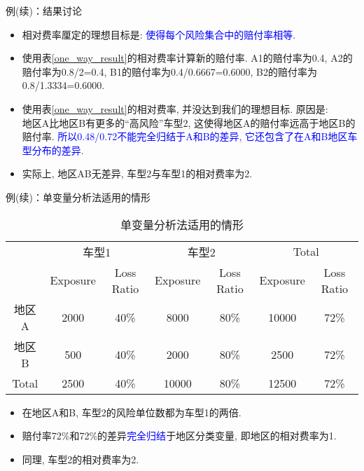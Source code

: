 \documentclass[professionalfont]{beamer}
\newcommand{\blue}[1]{\textcolor{blue}{#1}}
\begin{document}
\begin{frame}{例(续)：结果讨论}
\begin{itemize}	
\item 相对费率厘定的理想目标是: \blue{使得每个风险集合中的赔付率相等}.
\item 使用表\ref{one_way_result}的相对费率计算新的赔付率. A1的赔付率为0.4, A2的赔付率为0.8/2=0.4, B1的赔付率为0.4/0.6667=0.6000, B2的赔付率为0.8/1.3334=0.6000.
\item 使用表\ref{one_way_result}的相对费率, 并没达到我们的理想目标. 原因是:\\
地区A比地区B有更多的``高风险''车型2, 这使得地区A的赔付率远高于地区B的赔付率. \blue{所以0.48/0.72不能完全归结于A和B的差异, 它还包含了在A和B地区车型分布的差异}.
\item 实际上, 地区AB无差异, 车型2与车型1的相对费率为2.
\end{itemize}
\end{frame}

\begin{frame}{例(续)：单变量分析法适用的情形}
	
{\scriptsize
\begin{table}
\centering
\caption{单变量分析法适用的情形}
\label{my-label}
\begin{tabular}{ccccccc}
\hline
      & \multicolumn{2}{c}{车型1} & \multicolumn{2}{c}{车型2} & \multicolumn{2}{c}{Total} \\
      & Exposure  & Loss Ratio  & Exposure  & Loss Ratio  & Exposure   & Loss Ratio   \\ \hline
地区A   & 2000      & 40\%        & 8000      & 80\%        & 10000      & 72\%         \\
地区B   & 500       & 40\%        & 2000      & 80\%        & 2500       & 72\%         \\
Total & 2500      & 40\%        & 10000     & 80\%        & 12500      & 72\%         \\ \hline
\end{tabular}
\end{table}}
\begin{itemize}	
	\item 在地区A和B, 车型2的风险单位数都为车型1的两倍.
	\item 赔付率72\%和72\%的差异\blue{完全归结}于地区分类变量, 即地区的相对费率为1.
	\item 同理, 车型2的相对费率为2. 
\end{itemize}

~

\end{frame}
\end{document}
